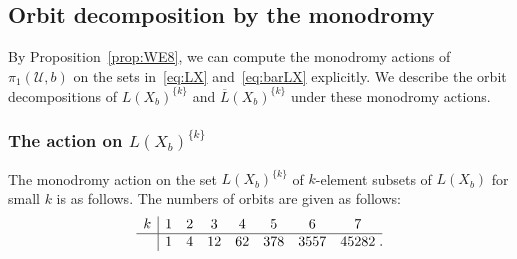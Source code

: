 \documentclass{math}
\theoremstyle{plain}
\numberwithin{equation}{section}
\newcommand{\UUU}{\mathord{\mathcal U}}
\newcommand{\pione}{\pi_1}
\newcommand{\barL}{\overline{L}}
\begin{document}
\subsection{Orbit decomposition by the monodromy}\label{subsec:orbitdecomp}
%
By Proposition~\ref{prop:WE8},  we can compute 
the monodromy actions of $\pione(\UUU, b)$
on the sets in~\eqref{eq:LX} and~\eqref{eq:barLX}
explicitly.
We describe the orbit decompositions of 
$L(X_b)^{\{k\}}$ and $\barL(X_b)^{\{k\}}$ 
under these monodromy actions.
%
\subsubsection{The action on  \texorpdfstring{$L(X_b)^{\{k\}}$}{LXbk}}
The monodromy action on the set $L(X_b)^{\{k\}}$ of $k$-element subsets of $L(X_b)$ 
for small $k$ is as follows.
The numbers of orbits are given as follows:
%
%
\begin{equation*}%
\begin{array}{c|ccccccc}
k & 1 & 2 & 3 & 4 & 5 & 6 &7  \\
\hline 
 & 1& 4 & 12 & 62 & 378 &  3557 & 45282\rlap{\;.}
\end{array}
\end{equation*}
%
%
%
\end{document}
